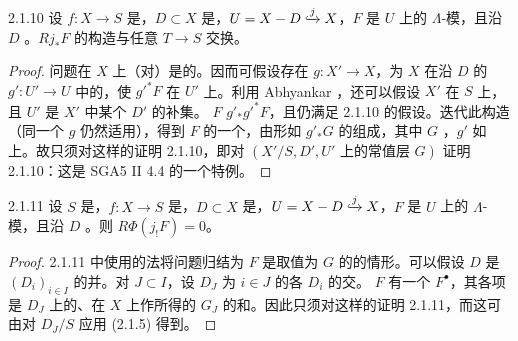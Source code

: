 \begin{SGAresult}{}{2.1.10}
设 $f:X\to S$ 是，$D\subset X$ 是，$U=X-D\lhook\joinrel\xrightarrow{j}X$，$F$ 是 $U$ 上的 $\Lambda$-模，且沿 $D$ 。$Rj_*F$ 的构造与任意 $T\to S$ 交换。
\end{SGAresult}
\begin{proof}
问题在 $X$ 上（对）是的。因而可假设存在 $g:X'\to X$，为 $X$ 在沿 $D$ 的 $g':U'\to U$ 中的，使 $g'^*F$ 在 $U'$ 上。利用 Abhyankar ，还可以假设 $X'$ 在 $S$ 上，且 $U'$ 是 $X'$ 中某个 $D'$ 的补集。
$F$  $g'_*g'^*F$，且仍满足 2.1.10 的假设。迭代此构造（同一个 $g$ 仍然适用），得到 $F$ 的一个，由形如 $g'_*G$ 的组成，其中 $G$ ，$g'$ 如上。故只须对这样的证明 2.1.10，即对 $(X'/S,D',U'\text{ 上的常值层 }G)$ 证明 2.1.10：这是 SGA5 II 4.4 的一个特例。
\end{proof}
\begin{SGAresult}{}{2.1.11}
设 $S$ 是，$f:X\to S$ 是，$D\subset X$ 是，$U=X-D\lhook\joinrel\xrightarrow{j}X$，$F$ 是 $U$ 上的 $\Lambda$-模，且沿 $D$ 。则 $R\Phi(j_!F)=0$。
\end{SGAresult}
\begin{proof}
2.1.11 中使用的法将问题归结为 $F$ 是取值为 $G$ 的的情形。可以假设 $D$ 是 $(D_i)_{i\in I}$ 的并。对 $J\subset I$，设 $D_J$ 为 $i\in J$ 的各 $D_i$ 的交。 $F$ 有一个 $F^\bullet$，其各项是 $D_J$ 上的、在 $X$ 上作所得的 $G_J$ 的和。因此只须对这样的证明 2.1.11，而这可由对 $D_J/S$ 应用 (2.1.5) 得到。
\end{proof}
